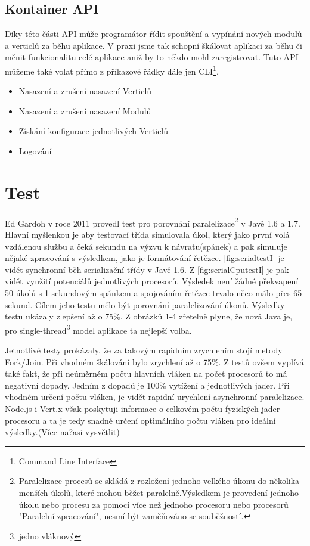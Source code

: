 \subsection{Kontainer API}

Díky této části API může programátor řídit spouštění a vypínání nových modulů a verticlů za běhu aplikace. V praxi jsme tak schopní škálovat aplikaci za běhu či měnit funkcionalitu celé aplikace aniž by to někdo mohl zaregistrovat. Tuto API můžeme také volat přímo z příkazové řádky dále jen CLI\footnote{Command Line Interface}.

\begin{itemize}
\item{Nasazení a zrušení nasazení Verticlů}
\item{Nasazení a zrušení nasazení Modulů}
\item{Získání konfigurace jednotlivých Verticlů}
\item{Logování}
\end{itemize}

\section{Test}
Ed Gardoh v roce 2011 provedl test\cite{serialTest} pro porovnání paralelizace\footnote{Paralelizace procesů se skládá z rozložení jednoho velkého úkonu do několika menších úkolů, které mohou běžet paralelně.Výsledkem je provedení jednoho úkolu nebo procesu za pomocí více než jednoho procesoru nebo procesorů "Paralelní zpracování", nesmí být zaměňováno se souběžností.} v Javě 1.6 a 1.7.
Hlavní myšlenkou je aby testovací třída simulovala úkol, který jako první volá vzdálenou službu a čeká sekundu na výzvu k návratu(spánek) a pak simuluje nějaké zpracování s výsledkem, jako je formátování řetězce.
\vref{fig:serialtestI} je vidět synchronní běh serializační třídy v Javě 1.6. Z \vref{fig:serialCputestI} je pak vidět využití potenciálů jednotlivých procesorů.
Výsledek není žádné překvapení 50 úkolů s 1 sekundovým spánkem a spojováním řetězce trvalo něco málo přes 65 sekund. 
Cílem jeho testu mělo být porovnání paralelizování úkonů. Výsledky testu ukázaly zlepšení až o 75\%. Z obrázků 1-4 zřetelně plyne, že nová Java je, pro single-thread\footnote{jedno vláknový} model aplikace ta nejlepší volba.

Jetnotlivé testy prokázaly, že za takovým rapidním zrychlením stojí metody Fork/Join. Při vhodném škálování bylo zrychlení až o 75\%. Z testů ovšem vyplívá také fakt, že při neúměrném počtu hlavních vláken na počet procesorů to má negativní dopady. Jedním z dopadů je 100\% vytížení a jednotlivých jader. Při vhodném určení počtu vláken, je vidět rapidní urychlení asynchronní paralelizace. Node.js i Vert.x však poskytuji informace o celkovém počtu fyzických jader procesoru a ta je tedy snadné určení optimálního počtu vláken pro ideální výsledky.(Více na?asi vysvětlit)

